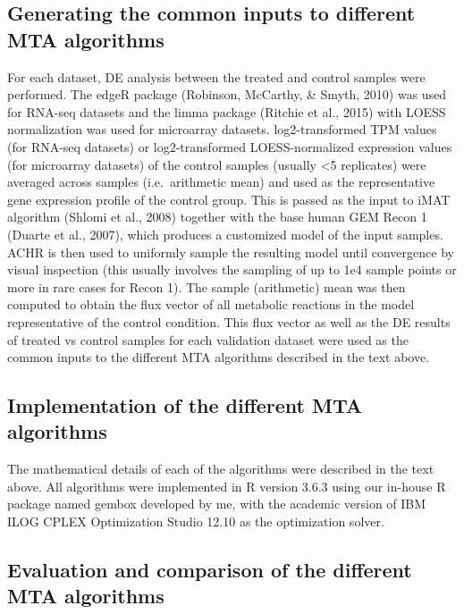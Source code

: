 \documentclass[12pt,twoside,openany,\mydriver]{thesis}  %
\begin{document}
\hypertarget{generating-the-common-inputs-to-different-mta-algorithms}{%
\subsection{Generating the common inputs to different MTA algorithms}\label{generating-the-common-inputs-to-different-mta-algorithms}}

For each dataset, DE analysis between the treated and control samples were performed. The edgeR package (Robinson, McCarthy, \& Smyth, 2010) was used for RNA-seq datasets and the limma package (Ritchie et al., 2015) with LOESS normalization was used for microarray datasets. log2-transformed TPM values (for RNA-seq datasets) or log2-transformed LOESS-normalized expression values (for microarray datasets) of the control samples (usually \textless{}5 replicates) were averaged across samples (i.e.~arithmetic mean) and used as the representative gene expression profile of the control group. This is passed as the input to iMAT algorithm (Shlomi et al., 2008) together with the base human GEM Recon 1 (Duarte et al., 2007), which produces a customized model of the input samples. ACHR is then used to uniformly sample the resulting model until convergence by visual inspection (this usually involves the sampling of up to 1e4 sample points or more in rare cases for Recon 1). The sample (arithmetic) mean was then computed to obtain the flux vector of all metabolic reactions in the model representative of the control condition. This flux vector as well as the DE results of treated vs control samples for each validation dataset were used as the common inputs to the different MTA algorithms described in the text above.

\hypertarget{implementation-of-the-different-mta-algorithms}{%
\subsection{Implementation of the different MTA algorithms}\label{implementation-of-the-different-mta-algorithms}}

The mathematical details of each of the algorithms were described in the text above. All algorithms were implemented in R version 3.6.3 using our in-house R package named gembox developed by me, with the academic version of IBM ILOG CPLEX Optimization Studio 12.10 as the optimization solver.

\hypertarget{evaluation-and-comparison-of-the-different-mta-algorithms}{%
\subsection{Evaluation and comparison of the different MTA algorithms}\label{evaluation-and-comparison-of-the-different-mta-algorithms}}
\end{document}
